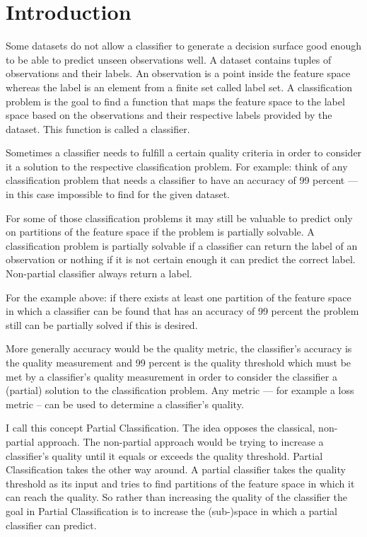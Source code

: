 \section{Introduction}
\label{sec:intro}

Some datasets do not allow a classifier to generate a
decision surface good enough to be able to predict unseen
observations well. A dataset contains tuples of
observations and their labels. An observation is a point
inside the feature space whereas the label is an element
from a finite set called label set. A classification
problem is the goal to find a function that maps the
feature space to the label space based on the observations
and their respective labels provided by the dataset.%
\cite[chapter 18]{ki} This function is called a classifier.

Sometimes a classifier needs to fulfill a certain quality
criteria in order to consider it a solution to the
respective classification problem. For example: think of
any classification problem that needs a classifier to have
an accuracy of 99 percent --- in this case impossible to
find for the given dataset.

For some of those classification problems it may still be
valuable to predict only on partitions of the feature
space if the problem is partially solvable. A
classification problem is partially solvable if a
classifier can return the label of an observation or
nothing if it is not certain enough it can predict the
correct label. Non-partial classifier always return a
label.

For the example above: if there exists at least one
partition of the feature space in which a classifier can be
found that has an accuracy of 99 percent the problem still
can be partially solved if this is desired.

More generally accuracy would be the quality metric,
the classifier's accuracy is the quality measurement and 99
percent is the quality threshold which must be met by a
classifier's quality measurement in order to consider the
classifier a (partial) solution to the classification
problem. Any metric --- for example a loss metric -- can be
used to determine a classifier's quality.

I call this concept Partial Classification. The idea
opposes the classical, non-partial approach. The
non-partial approach would be trying to increase a
classifier's quality until it equals or exceeds the quality
threshold. Partial Classification takes the other way
around. A partial classifier takes the quality threshold as
its input and tries to find partitions of the feature space
in which it can reach the quality. So rather than
increasing the quality of the classifier the goal in
Partial Classification is to increase the (sub-)space in
which a partial classifier can predict.

